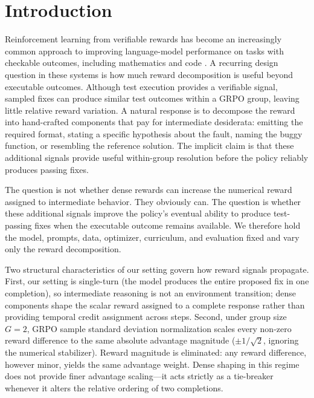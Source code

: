 \documentclass{article}
\begin{document}
\begin{abstract}
degeneracy but does not improve held-out repair accuracy over the simpler graded outcome reward, while the $G=2$ mathematical analysis provides a mechanistic explanation for how such shaping converts outcome ties into same-magnitude heuristic advantages.
\end{abstract}

\section{Introduction}
Reinforcement learning from verifiable rewards has become an increasingly common approach to improving language-model performance on tasks with checkable outcomes, including mathematics and code \cite{Shao2024, Guo2025}. A recurring design question in these systems is how much reward decomposition is useful beyond executable outcomes. Although test execution provides a verifiable signal, sampled fixes can produce similar test outcomes within a GRPO group, leaving little relative reward variation. A natural response is to decompose the reward into hand-crafted components that pay for intermediate desiderata: emitting the required format, stating a specific hypothesis about the fault, naming the buggy function, or resembling the reference solution. The implicit claim is that these additional signals provide useful within-group resolution before the policy reliably produces passing fixes.

The question is not whether dense rewards can increase the numerical reward assigned to intermediate behavior. They obviously can. The question is whether these additional signals improve the policy's eventual ability to produce test-passing fixes when the executable outcome remains available. We therefore hold the model, prompts, data, optimizer, curriculum, and evaluation fixed and vary only the reward decomposition. 

Two structural characteristics of our setting govern how reward signals propagate. First, our setting is single-turn (the model produces the entire proposed fix in one completion), so intermediate reasoning is not an environment transition; dense components shape the scalar reward assigned to a complete response rather than providing temporal credit assignment across steps. Second, under group size $G=2$, GRPO sample standard deviation normalization scales every non-zero reward difference to the same absolute advantage magnitude ($\pm 1/\sqrt{2}$, ignoring the numerical stabilizer). Reward magnitude is eliminated: any reward difference, however minor, yields the same advantage weight. Dense shaping in this regime does not provide finer advantage scaling—it acts strictly as a tie-breaker whenever it alters the relative ordering of two completions.
\end{document}
